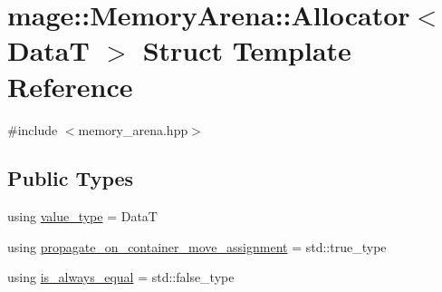 \hypertarget{structmage_1_1_memory_arena_1_1_allocator}{}\section{mage\+:\+:Memory\+Arena\+:\+:Allocator$<$ DataT $>$ Struct Template Reference}
\label{structmage_1_1_memory_arena_1_1_allocator}


{\ttfamily \#include $<$memory\+\_\+arena.\+hpp$>$}

\subsection*{Public Types}
\begin{DoxyCompactItemize}
\item 
using \hyperlink{structmage_1_1_memory_arena_1_1_allocator_a6ae3ef840bd738889b2c4136294a4f6d}{value\+\_\+type} = DataT
\item 
using \hyperlink{structmage_1_1_memory_arena_1_1_allocator_adeee02145ab4a2eca5e38a70babd81e0}{propagate\+\_\+on\+\_\+container\+\_\+move\+\_\+assignment} = std\+::true\+\_\+type
\item 
using \hyperlink{structmage_1_1_memory_arena_1_1_allocator_aa03d66542fcf507199911bca8b270bfc}{is\+\_\+always\+\_\+equal} = std\+::false\+\_\+type
\end{DoxyCompactItemize}
